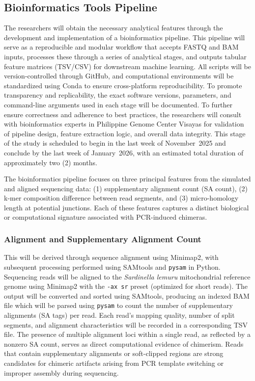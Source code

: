 \subsection{Bioinformatics Tools Pipeline}

The researchers will obtain the necessary analytical features through the development and implementation of a bioinformatics pipeline. This pipeline will serve as a reproducible and modular workflow that accepts FASTQ and BAM inputs, processes these through a series of analytical stages, and outputs tabular feature matrices (TSV/CSV) for downstream machine learning. All scripts will be version-controlled through GitHub, and computational environments will be standardized using Conda to ensure cross-platform reproducibility. To promote transparency and replicability, the exact software versions, parameters, and command-line arguments used in each stage will be documented. To further ensure correctness and adherence to best practices, the researchers will consult with bioinformatics experts in Philippine Genome Center Visayas for validation of pipeline design, feature extraction logic, and overall data integrity. This stage of the study is scheduled to begin in the last week of November~2025 and conclude by the last week of January~2026, with an estimated total duration of approximately two (2) months.

The bioinformatics pipeline focuses on three principal features from the simulated and aligned sequencing data: (1) supplementary alignment count (SA count), (2) k-mer composition difference between read segments, and (3) micro-homology length at potential junctions. Each of these features captures a distinct biological or computational signature associated with PCR-induced chimeras.

\subsubsection{Alignment and Supplementary Alignment Count}
This will be derived through sequence alignment using Minimap2, with subsequent processing performed using SAMtools and \texttt{pysam} in Python. Sequencing reads will be aligned to the \textit{Sardinella lemuru} mitochondrial reference genome using Minimap2 with the \texttt{-ax sr} preset (optimized for short reads). The output will be converted and sorted using SAMtools, producing an indexed BAM file which will be parsed using \texttt{pysam} to count the number of supplementary alignments (SA tags) per read. Each read’s mapping quality, number of split segments, and alignment characteristics will be recorded in a corresponding TSV file. The presence of multiple alignment loci within a single read, as reflected by a nonzero SA count, serves as direct computational evidence of chimerism. Reads that contain supplementary alignments or soft-clipped regions are strong candidates for chimeric artifacts arising from PCR template switching or improper assembly during sequencing.

